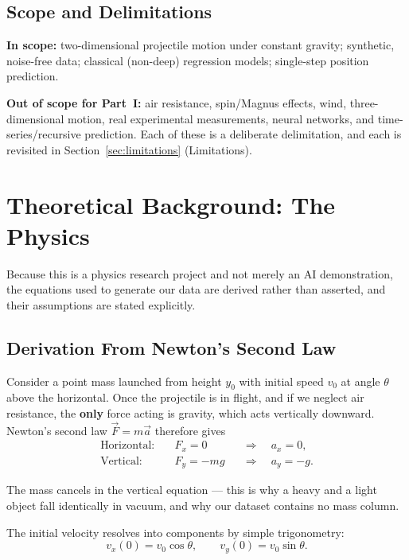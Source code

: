 \documentclass[11pt,a4paper]{article}
\newcommand{\vzero}{v_{0}}
\newcommand{\yzero}{y_{0}}
\begin{document}
\subsection{Scope and Delimitations}

\textbf{In scope:} two-dimensional projectile motion under constant gravity; synthetic, noise-free
data; classical (non-deep) regression models; single-step position prediction.

\textbf{Out of scope for Part~I:} air resistance, spin/Magnus effects, wind, three-dimensional
motion, real experimental measurements, neural networks, and time-series/recursive prediction. Each
of these is a deliberate delimitation, and each is revisited in
Section~\ref{sec:limitations} (Limitations).

\section{Theoretical Background: The Physics}\label{sec:physics}

Because this is a physics research project and not merely an AI demonstration, the equations used
to generate our data are derived rather than asserted, and their assumptions are stated explicitly.

\subsection{Derivation From Newton's Second Law}

Consider a point mass launched from height $\yzero$ with initial speed $\vzero$ at angle $\theta$
above the horizontal. Once the projectile is in flight, and if we neglect air resistance, the
\textbf{only} force acting is gravity, which acts vertically downward. Newton's second law
$\vec{F}=m\vec{a}$ therefore gives
\begin{align}
  \text{Horizontal:}\quad & F_{x}=0    &&\Longrightarrow\quad a_{x}=0, \\
  \text{Vertical:}\quad   & F_{y}=-mg  &&\Longrightarrow\quad a_{y}=-g.
\end{align}

The mass cancels in the vertical equation --- this is why a heavy and a light object fall
identically in vacuum, and why our dataset contains no mass column.

The initial velocity resolves into components by simple trigonometry:
\begin{equation}
  v_{x}(0)=\vzero\cos\theta, \qquad v_{y}(0)=\vzero\sin\theta .
\end{equation}
\end{document}
